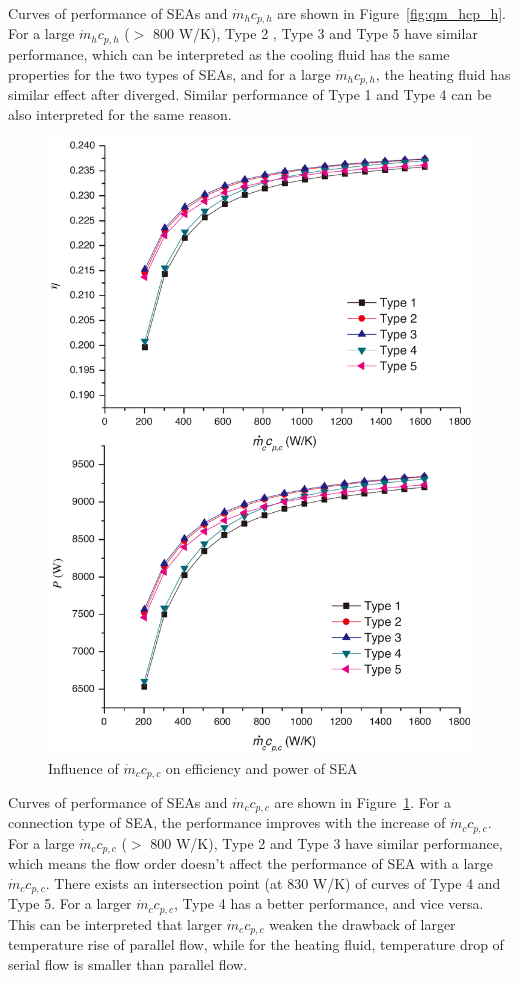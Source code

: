 Curves of performance of SEAs and $\dot{m}_hc_{p,h}$ are shown in Figure~\ref{fig:qm_hcp_h}.
For a large $\dot{m}_hc_{p,h}$ ($>$ 800 W/K), Type 2 , Type 3 and Type 5 have similar performance, which can be interpreted as the cooling fluid has the same properties for the two types of SEAs, and for a large $\dot{m}_hc_{p,h}$, the heating fluid has similar effect after diverged. Similar performance of Type 1 and Type 4 can be also interpreted for the same reason.

\noindent \begin{figure}[htbp]
\begin{center}
	\includegraphics[width = 0.7\columnwidth]{fig/qm_ccp_c}
	\caption{Influence of $\dot{m}_cc_{p,c}$ on efficiency and power of SEA}
	\label{fig:qm_ccp_c}
\end{center}
\end{figure}

Curves of performance of SEAs and $\dot{m}_cc_{p,c}$ are shown in Figure~\ref{fig:qm_ccp_c}. For a connection type of SEA, the performance improves with the increase of $\dot{m}_cc_{p,c}$. For a large $\dot{m}_cc_{p,c}$ ($>$ 800 W/K), Type 2 and Type 3 have similar performance, which means the flow order doesn't affect the performance of SEA with a large $\dot{m}_cc_{p,c}$. There exists an intersection point (at 830 W/K) of curves of Type 4 and Type 5. For a larger $\dot{m}_cc_{p,c}$, Type 4 has a better performance, and vice versa. This can be interpreted that larger $\dot{m}_cc_{p,c}$ weaken the drawback of larger temperature rise of parallel flow, while for the heating fluid, temperature drop of serial flow is smaller than parallel flow.

